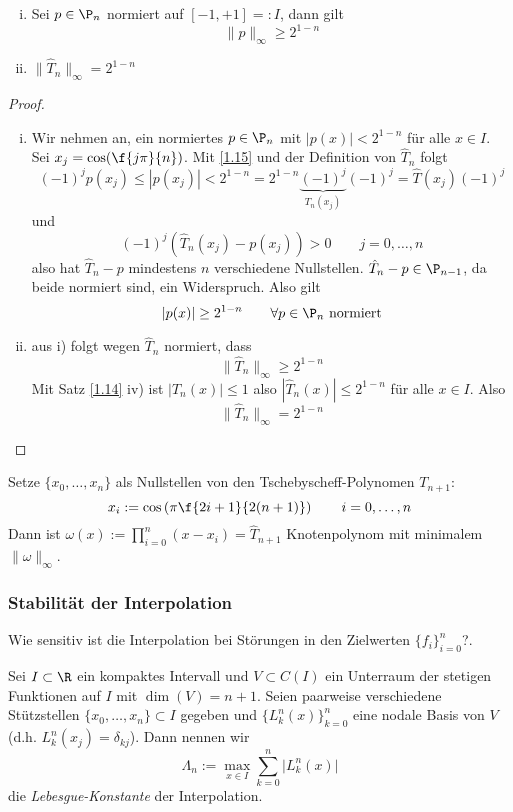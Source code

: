 \documentclass[a4paper,11pt]{scrartcl}
\begin{document}
\begin{st}[Optimalität]
	\label{1.15}
	\begin{enumerate}[i)]
		\item 
			Sei $p\in \P_n$ normiert auf $[-1,+1] =: I$, dann gilt
			\[
				\|p\|_\infty \ge 2^{1-n}
			\]
		\item
			$\displaystyle \|\hat T_n \|_\infty = 2^{1-n}$
	\end{enumerate}
	\begin{proof}
		\begin{enumerate}[i)]
			\item 
				Wir nehmen an, ein normiertes $p\in \P_n$ mit $|p(x)|<2^{1-n}$ für alle $x\in I$.
				Sei $x_j= \cos(\f {j\pi}{n})$.
				Mit \ref{1.15} und der Definition von $\hat T_n$ folgt
				\[
					(-1)^j p(x_j) \le |p(x_j)| < 2^{1-n} = 2^{1-n}\underbrace{(-1)^j}_{T_n(x_j)}(-1)^j = \hat T(x_j)(-1)^j
				\]
				und
				\[
					(-1)^j(\hat T_n(x_j)-p(x_j)) > 0 \qquad j=0,\dotsc,n
				\]
				also hat $\hat T_n -p$ mindestens $n$ verschiedene Nullstellen. $\hat T_n-p\in \P_{n-1}$, da beide normiert sind, ein Widerspruch.
				Also gilt
				\[
					|p(x)| \ge 2^{1-n} \qquad \forall p\in \P_n \text{ normiert}
				\]
			\item
				aus i) folgt wegen $\hat T_n$ normiert, dass
				\[
					\|\hat T_n\|_\infty \ge 2^{1-n}
				\]
				Mit Satz \ref{1.14} iv) ist $|T_n(x)| \le 1$ also $|\hat T_n(x)| \le 2^{1-n}$ für alle $x\in I$.
				Also 
				\[
					\|\hat T_n\|_\infty = 2^{1-n}
				\]
		\end{enumerate}
	\end{proof}
\end{st}

\begin{kor}
	\label{1.16}
	Setze $\{x_0,\dotsc,x_n\}$ als Nullstellen von den Tschebyscheff-Polynomen $T_{n+1}$:
	\[
		x_i := \cos\left(\pi\f{2i+1}{2(n+1)}\right) \qquad i=0,\dotsc,n
	\]
	Dann ist $\omega(x) := \prod_{i=0}^n (x-x_i) = \hat T_{n+1}$ Knotenpolynom mit minimalem $\|\omega\|_\infty$.
\end{kor}


\subsubsection{Stabilität der Interpolation}


Wie sensitiv ist die Interpolation bei Störungen in den Zielwerten $\{f_i\}_{i=0}^n$?.

\begin{df} \label{1.17}
	Sei $I\subset \R$ ein kompaktes Intervall und $V\subset C(I)$ ein Unterraum der stetigen Funktionen auf $I$ mit $\dim(V)=n+1$.
	Seien paarweise verschiedene Stützstellen $\{x_0,\dotsc, x_n\}\subset I$ gegeben und $\{L_k^n(x)\}_{k=0}^n$ eine nodale Basis von $V$ (d.h. $L_k^n(x_j) = \delta_{kj}$).
	Dann nennen wir
	\[
		\Lambda_n := \max_{x\in I}\sum_{k=0}^n \big|L_k^n(x)\big|
	\]
	die \emph{Lebesgue-Konstante} der Interpolation.
\end{df}
\end{document}
